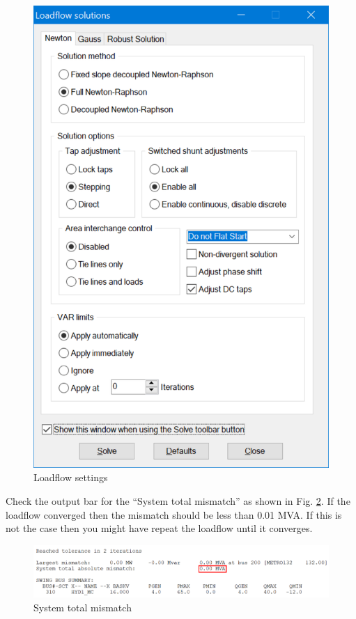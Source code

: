 \documentclass[paper=a4, fontsize=11pt]{article}
\begin{document}
\begin{figure}[h]
\centering
\includegraphics[scale=0.32]{fig3_loadflow.pdf}
\caption{Loadflow settings}
\label{fig:3}
\end{figure}

Check the output bar for the ``System total mismatch'' as shown in Fig. \ref{fig:4}. If the loadflow converged then the mismatch should be less than 0.01 MVA. If this is not the case then you might have repeat the loadflow until it converges.

\begin{figure}[h]
\centering
\includegraphics[scale=0.32]{fig4_mismatch.pdf}
\caption{System total mismatch}
\label{fig:4}
\end{figure}
\end{document}
